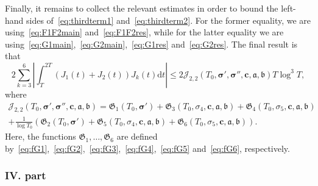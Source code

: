 \documentclass[a4paper,reqno]{amsart}
\theoremstyle{definition}
\newcommand{\dif}[1]{\mathrm{d}#1}
\begin{document}
Finally, it remains to collect the relevant estimates in order to bound the left-hand sides of~\eqref{eq:thirdterm1} and~\eqref{eq:thirdterm2}. For the former equality, we are using~\eqref{eq:F1F2main} and~\eqref{eq:F1F2res}, while for the latter equality we are using~\eqref{eq:G1main},~\eqref{eq:G2main},~\eqref{eq:G1res} and~\eqref{eq:G2res}. The final result is that
\begin{equation}
\label{eq:J22}   
2\sum_{k=3}^{6}\left|\int_{T}^{2T}\left(J_1(t)+J_2(t)\right)J_{k}(t)\dif{t}\right| \leq 2\mathcal{J}_{2,2}\left(T_0,\bm{\sigma}',\bm{\sigma}'',\bm{c},\bm{\mathfrak{a}},\bm{\mathfrak{b}}\right)T\log^{3}{T},
\end{equation}
where
\begin{multline}
\label{eq:cJ22} 
\mathcal{J}_{2,2}\left(T_0,\bm{\sigma}',\bm{\sigma}'',\bm{c},\bm{\mathfrak{a}},\bm{\mathfrak{b}}\right) = \mathfrak{G}_1\left(T_0,\bm{\sigma}'\right) + \mathfrak{G}_{3}\left(T_0,\sigma_4,\bm{c},\bm{\mathfrak{a}},\bm{\mathfrak{b}}\right) + \mathfrak{G}_{4}\left(T_0,\sigma_5,\bm{c},\bm{\mathfrak{a}},\bm{\mathfrak{b}}\right) \\ 
+ \frac{1}{\log{T_0}}\left(\mathfrak{G}_{2}\left(T_0,\bm{\sigma}'\right)+\mathfrak{G}_{5}\left(T_0,\sigma_4,\bm{c},\bm{\mathfrak{a}},\bm{\mathfrak{b}}\right)+\mathfrak{G}_{6}\left(T_0,\sigma_5,\bm{c},\bm{\mathfrak{a}},\bm{\mathfrak{b}}\right)\right).
\end{multline}
Here, the functions $\mathfrak{G}_{1},\ldots,\mathfrak{G}_{6}$ are defined by~\eqref{eq:fG1},~\eqref{eq:fG2},~\eqref{eq:fG3},~\eqref{eq:fG4},~\eqref{eq:fG5} and~\eqref{eq:fG6}, respectively.

\subsubsection{IV. part}
\label{sec:IVpart}
\end{document}
